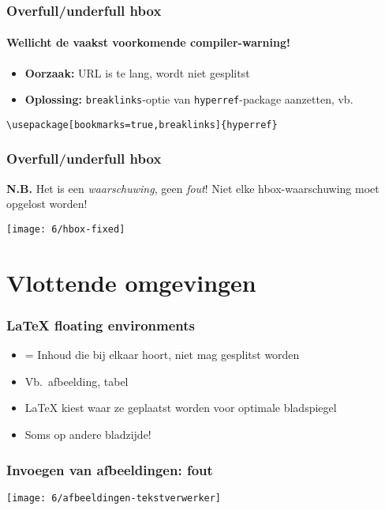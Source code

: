 \documentclass[aspectratio=169]{beamer}
\begin{document}
\begin{frame}[fragile]
  \frametitle{Overfull/underfull hbox}
  \framesubtitle{Wellicht de vaakst voorkomende compiler-warning!}

  \begin{itemize}
    \item \textbf{Oorzaak:} URL is te lang, wordt niet gesplitst
    \item \textbf{Oplossing:} \texttt{breaklinks}-optie van \texttt{hyperref}-package aanzetten, vb.
  \end{itemize}

  \begin{verbatim}
\usepackage[bookmarks=true,breaklinks]{hyperref}
\end{verbatim}
\end{frame}

\begin{frame}
  \frametitle{Overfull/underfull hbox}

  \textbf{N.B.} Het is een \emph{waarschuwing}, geen \emph{fout}! Niet elke hbox-waarschuwing moet opgelost worden!

  \centering
  \texttt{[image: 6/hbox-fixed]}

\end{frame}

\section{Vlottende omgevingen}

\begin{frame}
  \frametitle{{\LaTeX} floating environments}

  \begin{itemize}
    \item = Inhoud die bij elkaar hoort, niet mag gesplitst worden
    \item Vb.\ afbeelding, tabel
    \item {\LaTeX} kiest waar ze geplaatst worden voor optimale bladspiegel
    \item Soms op andere bladzijde!
  \end{itemize}

\end{frame}

\begin{frame}
  \frametitle{Invoegen van afbeeldingen: fout}

  \centering
  \texttt{[image: 6/afbeeldingen-tekstverwerker]}

\end{frame}
\end{document}
